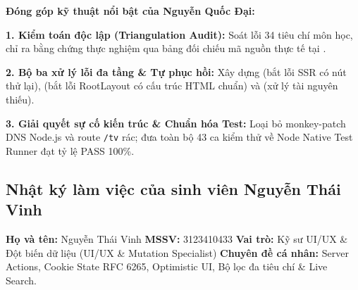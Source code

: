 \documentclass[12pt,a4paper]{extarticle}
\begin{document}
\noindent \textbf{Đóng góp kỹ thuật nổi bật của Nguyễn Quốc Đại:}

\textbf{1. Kiểm toán độc lập (Triangulation Audit):} Soát lỗi 34 tiêu chí môn học, chỉ ra bằng chứng thực nghiệm qua bảng đối chiếu mã nguồn thực tế tại .

\textbf{2. Bộ ba xử lý lỗi đa tầng \& Tự phục hồi:} Xây dựng  (bắt lỗi SSR có nút thử lại),  (bắt lỗi RootLayout có cấu trúc HTML chuẩn) và  (xử lý tài nguyên thiếu).

\textbf{3. Giải quyết sự cố kiến trúc \& Chuẩn hóa Test:} Loại bỏ monkey-patch DNS Node.js và route \texttt{/tv} rác; đưa toàn bộ 43 ca kiểm thử về Node Native Test Runner đạt tỷ lệ PASS 100\%.

\newpage
\subsection{Nhật ký làm việc của sinh viên Nguyễn Thái Vinh}

\noindent \textbf{Họ và tên:} Nguyễn Thái Vinh \hspace{1cm} \textbf{MSSV:} 3123410433 \newline
\textbf{Vai trò:} Kỹ sư UI/UX \& Đột biến dữ liệu (UI/UX \& Mutation Specialist) \newline
\textbf{Chuyên đề cá nhân:} Server Actions, Cookie State RFC 6265, Optimistic UI, Bộ lọc đa tiêu chí \& Live Search.
\end{document}
